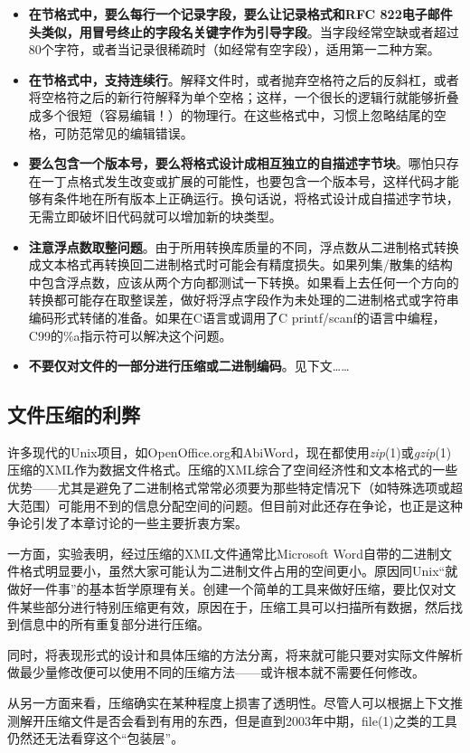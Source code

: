 \documentclass[12pt,oneside]{book}
\begin{document}
\begin{itemize}
\item \textbf{在节格式中，要么每行一个记录字段，要么让记录格式和RFC 822电子邮件头类似，用冒号终止的字段名关键字作为引导字段}。当字段经常空缺或者超过80个字符，或者当记录很稀疏时（如经常有空字段），适用第一二种方案。
\item \textbf{在节格式中，支持连续行}。解释文件时，或者抛弃空格符之后的反斜杠，或者将空格符之后的新行符解释为单个空格；这样，一个很长的逻辑行就能够折叠成多个很短（容易编辑！）的物理行。在这些格式中，习惯上忽略结尾的空格，可防范常见的编辑错误。
\item \textbf{要么包含一个版本号，要么将格式设计成相互独立的自描述字节块}。哪怕只存在一丁点格式发生改变或扩展的可能性，也要包含一个版本号，这样代码才能够有条件地在所有版本上正确运行。换句话说，将格式设计成自描述字节块，无需立即破坏旧代码就可以增加新的块类型。
\item \textbf{注意浮点数取整问题}。由于所用转换库质量的不同，浮点数从二进制格式转换成文本格式再转换回二进制格式时可能会有精度损失。如果列集/散集的结构中包含浮点数，应该从两个方向都测试一下转换。如果看上去任何一个方向的转换都可能存在取整误差，做好将浮点字段作为未处理的二进制格式或字符串编码形式转储的准备。如果在C语言或调用了C printf/scanf的语言中编程，C99的\%{}a指示符可以解决这个问题。
\item \textbf{不要仅对文件的一部分进行压缩或二进制编码}。见下文……
\end{itemize}


\subsection{文件压缩的利弊}
许多现代的Unix项目，如OpenOffice.org和AbiWord，现在都使用\textit{zip}(1)或\textit{gzip}(1)压缩的XML作为数据文件格式。压缩的XML综合了空间经济性和文本格式的一些优势——尤其是避免了二进制格式常常必须要为那些特定情况下（如特殊选项或超大范围）可能用不到的信息分配空间的问题。但目前对此还存在争论，也正是这种争论引发了本章讨论的一些主要折衷方案。

一方面，实验表明，经过压缩的XML文件通常比Microsoft Word自带的二进制文件格式明显要小，虽然大家可能认为二进制文件占用的空间更小。原因同Unix“就做好一件事”的基本哲学原理有关。创建一个简单的工具来做好压缩，要比仅对文件某些部分进行特别压缩更有效，原因在于，压缩工具可以扫描所有数据，然后找到信息中的所有重复部分进行压缩。

同时，将表现形式的设计和具体压缩的方法分离，将来就可能只要对实际文件解析做最少量修改便可以使用不同的压缩方法——或许根本就不需要任何修改。
  
从另一方面来看，压缩确实在某种程度上损害了透明性。尽管人可以根据上下文推测解开压缩文件是否会看到有用的东西，但是直到2003年中期，file(1)之类的工具仍然还无法看穿这个“包装层”。
\end{document}

